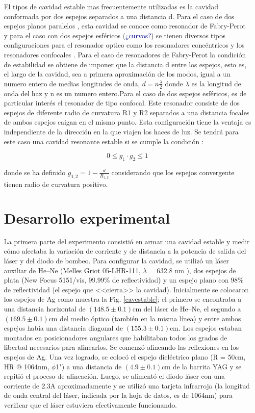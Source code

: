 \documentclass[10pt, a4paper]{article}%
\begin{document}
\begin{multicols}{2}
El tipos de cavidad estable mas frecuentemente utilizadas es la cavidad conformada por dos espejos separados a una distancia d. Para el caso de dos espejos planos paralelos , esta cavidad se conoce como resonador de Fabry-Perot y para el caso con dos espejos esféricos ({\textcolor{DarkBlue}{¿curvos?}}) se tienen diversos tipos configuraciones para el resonador optico como los resonadores concéntricos y los resonadores confocales . Para el caso de resonadores de Fabry-Perot la condición de estabilidad se obtiene de imponer que la distancia d entre los espejos, esto es, el largo de la cavidad, sea a primera aproximación de los modos, igual a un numero entero de medias longitudes de onda, ${ d = n \frac{\lambda}{2} }$ donde ${\lambda}$ es la longitud de onda del haz y n es un numero entero.Para el caso de dos espejos esféricos, es de particular interés el resonador de tipo confocal. Este resonador consiste de dos espejos de diferente radio de curvatura R1 y R2 separados a una distancia focales de ambos espejos caigan en el mismo punto. Esta configuración tiene la ventaja es independiente de la dirección en la que viajen los haces de luz. Se tendrá para este caso una cavidad resonante estable si se cumple la condición : 

\begin{equation}
    0 \leq g_1 \cdot g_2 \leq 1
\end{equation}

donde se ha definido ${g_{1,2} = 1 - \frac{d}{R_{1,2}}}$ considerando que los espejos convergente tienen radio de curvatura positivo.

\fi

\section{Desarrollo experimental}
La primera parte del experimento consistió en armar una cavidad estable y medir cómo afectaba la variación de corriente y de distancia a la potencia de salida del láser y del diodo de bombeo. Para configurar la cavidad, se utilizó un láser auxiliar de He--Ne (Melles Griot 05-LHR-111, $\lambda$ = 632.8 nm ), dos espejos de plata (New Focus 5151/vis, 99.99\% de reflectividad) y un espejo plano con 98\% de reflectividad (el espejo que <<cierra>> la cavidad). Inicialmente se colocaron los espejos de Ag como muestra la Fig. \ref{cavestable}; el primero se encontraba a una distancia horizontal de $(148.5 \pm 0.1)$cm del láser de He--Ne, el segundo a $(169.5 \pm 0.1)$cm del medio óptico (también en la misma línea) y entre ambos espejos había una distancia diagonal de $(155.3 \pm 0.1)$cm. Los espejos estaban montados en posicionadores angulares que habilitaban todos los grados de libertad necesarios para alinearlos. Se comenzó alineando las reflexiones en los espejos de Ag. Una vez logrado, se colocó el espejo dieléctrico plano (R = 50cm, HR @ 1064nm, $\phi$1") a una distancia de $(4.9 \pm 0.1)$cm de la barrita YAG y se repitió el proceso de alineación. Luego, se alimentó el diodo láser con una corriente de 2.3A aproximadamente y se utilizó una tarjeta infrarroja (la longitud de onda central del láser, indicada por la hoja de datos, es de 1064nm) para verificar que el láser estuviera efectivamente funcionando. 


\end{multicols}
\end{document}
